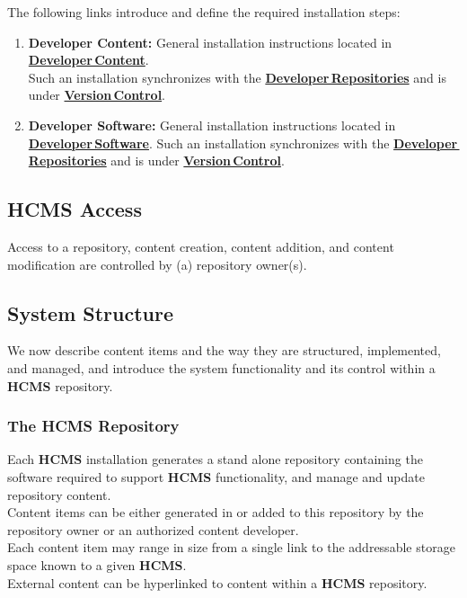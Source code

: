\documentclass[12pt]{article}
\begin{document}
The following links introduce and define the required installation steps:
\begin{enumerate}
\item {\bf Developer Content:} General installation instructions located in \href{../heterarch-developer-content/heterarch-developer-content.tex}{\bf Developer\,Content}.\\
Such an installation synchronizes with the \href{../developer-repository/developer-repository.tex}{\bf Developer\,Repositories} and is under \href{../version-control/version-control.tex}{\bf Version\,Control}.
\item {\bf Developer Software:} General installation instructions located in \href{../heterarch-developer-software.tex}{\bf Developer\,Software}. Such an installation synchronizes with the \href{../developer-repository/developer-repository.tex}{\bf Developer\,Repositories} and is under \href{../version-control/version-control.tex}{\bf Version\,Control}.\\
\end{enumerate}

\subsection*{HCMS Access}

Access to a repository, content creation, content addition, and content modification are controlled by (a) repository owner(s).

\subsection*{System Structure}

We now describe content items and the way they are structured, implemented, and managed, and introduce the system functionality and its control within a {\bf \small HCMS} repository.

\subsubsection*{The HCMS Repository}

Each {\bf \small HCMS} installation generates a stand alone repository containing the software required to support {\bf \small HCMS} functionality, and manage and update repository content.\\
Content items can be either generated in or added to this repository by the repository owner or an authorized content developer.\\
Each content item may range in size from a single link to the addressable storage space known to a given {\bf \small HCMS}.\\
External content can be hyperlinked to content within a {\bf \small HCMS} repository.
\end{document}
